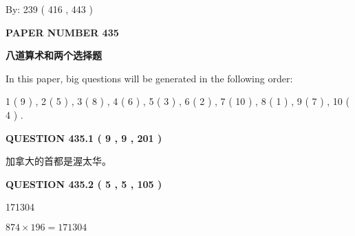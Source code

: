 \documentclass{ctexart}
\begin{document}
   
\hspace{1.0in} By: 
 239 ( 416 ,  443 )
   
   
   
   
\newpage 
\setcounter{page}{ 
   435001 } 
   
   
   
   
 {\textbf{ \Large{ PAPER NUMBER  435  }}}
   
   
\vspace{0.2in}
   
   
   
   
   
   
 \vspace{0.2in}
{\LARGE {\textbf{ 八道算术和两个选择题}}}
   
   
   
\vspace{0.2in}
   
In this paper, big questions will be generated in the following order: 
   
   
   1 ( 9 )
 ,
   2 ( 5 )
 ,
   3 ( 8 )
 ,
   4 ( 6 )
 ,
   5 ( 3 )
 ,
   6 ( 2 )
 ,
   7 ( 10 )
 ,
   8 ( 1 )
 ,
   9 ( 7 )
 ,
   10 ( 4 )
 .
  
\vspace{0.2in}
  
{\textbf{\Large{QUESTION
435.1 
 ( 9 , 9 , 201 )
}}}
  
  
 
 
\noindent{}
 
 
加拿大的首都是渥太华。
 
 
 
 
  
\vspace{0.2in}
  
{\textbf{\Large{QUESTION
435.2 
 ( 5 , 5 , 105 )
}}}
  
  
 
 
\noindent{}

171304
 
 
 
 
\noindent{}

$ %
874 \times  %
196=   %
171304$
 
\end{document}
